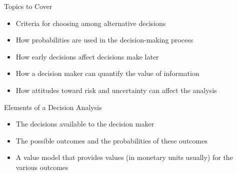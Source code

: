 \documentclass{beamer}\usepackage[]{graphicx}\usepackage[]{color}
\begin{document}
\begin{darkframes}
    \begin{frame}[fragile]{Topics to Cover}
    \fontsize{10}{10}\selectfont
          \begin{itemize}[<+->]
            \item Criteria for choosing among alternative decisions
            \item How probabilities are used in the decision-making process
            \item How early decisions affect decisions make later
            \item How a decision maker can quantify the value of information
            \item How attitudes toward risk and uncertainty can affect the analysis
          \end{itemize}

    \end{frame}


    \begin{frame}[fragile]{Elements of a Decision Analysis}
      \fontsize{10}{10}\selectfont  

        \begin{itemize}[<+->]
            \item The decisions available to the decision maker
            \item The possible outcomes and the probabilities of these outcomes
            \item A value model that provides values (in monetary units usually) for the various outcomes
        \end{itemize}


    \end{frame}



\end{darkframes}
\end{document}
